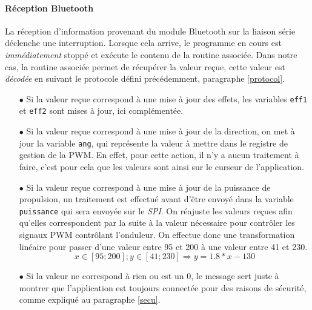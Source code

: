 			\paragraph{Réception Bluetooth} La réception d'information provenant du module Bluetooth sur la liaison série déclenche une interruption. Lorsque cela arrive, le programme en cours est \textit{immédiatement} stoppé et exécute le contenu de la routine associée. Dans notre cas, la routine associée permet de récupérer la valeur reçue, cette valeur est \textit{décodée} en suivant le protocole défini précédemment, paragraphe \ref{protocol}.
			\begin{itemize}
			\item[$\bullet$] Si la valeur reçue correspond à une mise à jour des effets, les variables \texttt{eff1} et \texttt{eff2} sont mises à jour, ici complémentée. 
			\item[$\bullet$] Si la valeur reçue correspond à une mise à jour de la direction, on met à jour la variable \texttt{ang}, qui représente la valeur à mettre dans le registre de gestion de la PWM. En effet, pour cette action, il n'y a aucun traitement à faire, c'est pour cela que les valeurs sont ainsi sur le curseur de l'application.
			\item[$\bullet$] Si la valeur reçue correspond à une mise à jour de la puissance de propulsion, un traitement est effectué avant d'être envoyé dans la variable \texttt{puissance} qui sera envoyée sur le \textit{SPI}. On réajuste les valeurs reçues afin qu'elles correspondent par la suite à la valeur nécessaire pour contrôler les signaux PWM contrôlant l'onduleur. On effectue donc une transformation linéaire pour passer d'une valeur entre 95 et 200 à une valeur entre 41 et 230.
			$$ x\in [95;200];y\in [41;230] \Rightarrow y=1.8*x-130 $$
			\label{picmain}
			\item[$\bullet$] Si la valeur ne correspond à rien ou est un 0, le message sert juste à montrer que l'application est toujours connectée pour des raisons de sécurité, comme expliqué au paragraphe \ref{secu}.		
			\end{itemize}			 
